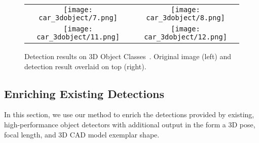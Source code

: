 \begin{figure}[h]
    \begin{center}
    \setlength\tabcolsep{0pt}
\begin{tabular}{cc}
  \texttt{[image: car\_3dobject/7.png]} &   
  \texttt{[image: car\_3dobject/8.png]}\\ [-15pt]
  \texttt{[image: car\_3dobject/11.png]} &   
  \texttt{[image: car\_3dobject/12.png]}\\ [-5pt]
\end{tabular}
\end{center}
\caption{Detection results on 3D Object
  Classes~\cite{Savarese07}. Original image (left) and detection
  result overlaid on top (right).}%
  \label{fig:3dobject}
\end{figure}


% 

\subsection{Enriching Existing Detections}
\label{sec:exp_enrich}
In this section, we use our method to enrich the detections provided
by existing, high-performance object detectors with additional output
in the form a 3D pose, focal length, and 3D CAD model exemplar shape.

